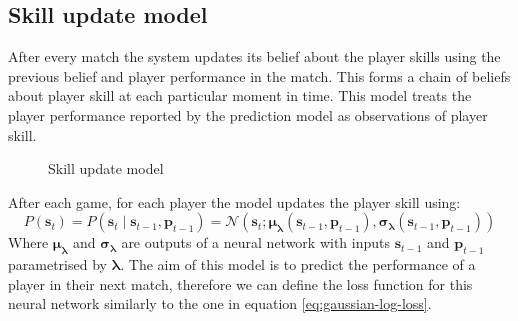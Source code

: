 \documentclass[12pt,a4paper]{book}
\newcommand\bs[1]{\boldsymbol{#1}}
\begin{document}
\subsection{Skill update model}
After every match the system updates its belief about the player skills using the previous belief and player performance in the match.
This forms a chain of beliefs about player skill at each particular moment in time.
This model treats the player performance reported by the prediction model as observations of player skill.
\begin{figure}[ht]
\centering
{}
\caption{Skill update model}
\label{fig:skill-update}
\end{figure}
After each game, for each player the model updates the player skill using:
\begin{equation}
P(\bs{s}_t) = P(\bs{s}_t\mid \bs{s}_{t-1},\bs{p}_{t-1}) = \mathcal{N}(\bs{s}_t;\bs{\mu_\lambda}(\bs{s}_{t-1},\bs{p}_{t-1}),\bs{\sigma_\lambda}(\bs{s}_{t-1},\bs{p}_{t-1}))
\end{equation}
Where $\bs{\mu_\lambda}$ and $\bs{\sigma_\lambda}$ are outputs of a neural network with inputs $\bs{s}_{t-1}$ and $\bs{p}_{t-1}$ parametrised by $\bs{\lambda}$.
The aim of this model is to predict the performance of a player in their next match, therefore we can define the loss function for this neural network similarly to the one in equation \ref{eq:gaussian-log-loss}.
\end{document}
